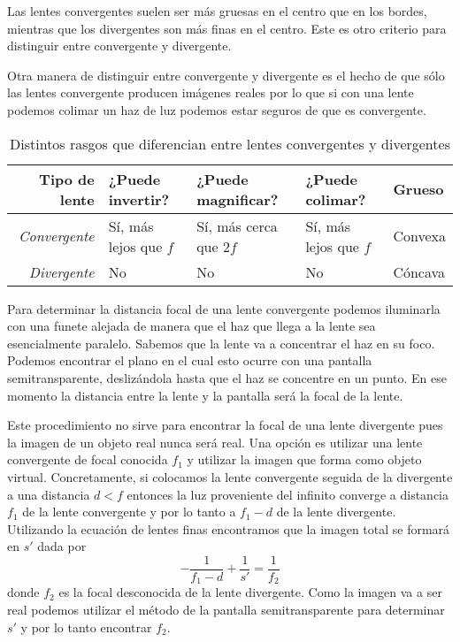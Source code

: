 \documentclass[12pt]{article}
\numberwithin{table}{section}
\numberwithin{figure}{section}
\numberwithin{equation}{section}
\begin{document}
Las lentes convergentes suelen ser más gruesas en el centro que en los bordes, mientras que los divergentes son más finas en el centro. Este es otro criterio para distinguir entre convergente y divergente. 

Otra manera de distinguir entre convergente y divergente es el hecho de que sólo las lentes convergente producen imágenes reales por lo que si con una lente podemos colimar un haz de luz podemos estar seguros de que es convergente. 

\begin{table}[htb]
	\small \sffamily \centering
	\caption{Distintos rasgos que diferencian entre lentes convergentes y divergentes}
	\label{tab:rasgos}
	\begin{tabular}{@{}rllll@{}}
		\toprule 
		\textbf{Tipo de lente} & ¿Puede invertir? & ¿Puede magnificar? & ¿Puede colimar? & Grueso \\
		\midrule
		\emph{Convergente} & Sí, más lejos que \( f \) & Sí, más cerca que \( 2f \) & Sí, más lejos que \( f \) & Convexa \\ 
		\emph{Divergente} & No & No & No & Cóncava  \\ 
\bottomrule
	\end{tabular}
\end{table}

Para determinar la distancia focal de una lente convergente podemos iluminarla con una funete alejada de manera que el haz que llega a la lente sea esencialmente paralelo. Sabemos que la lente va a concentrar el haz en su foco. Podemos encontrar el plano en el cual esto ocurre con una pantalla semitransparente, deslizándola hasta que el haz se concentre en un punto. En ese momento la distancia entre la lente y la pantalla será la focal de la lente.

Este procedimiento no sirve para encontrar la focal de una lente divergente pues la imagen de un objeto real nunca será real. Una opción es utilizar una lente convergente de focal conocida \( f_1 \) y utilizar la imagen que forma como objeto virtual. Concretamente, si colocamos la lente convergente seguida de la divergente a una distancia \( d < f \) entonces la luz proveniente del infinito converge a distancia \( f_1 \) de la lente convergente y por lo tanto a \( f_1 - d \) de la lente divergente. Utilizando la ecuación de lentes finas encontramos que la imagen total se formará en \( s' \) dada por
\begin{equation*}
	-\frac{1}{f_1 - d} + \frac{1}{s'} = \frac{1}{f_2}
\end{equation*}
donde \( f_2 \) es la focal desconocida de la lente divergente. Como la imagen va a ser real podemos utilizar el método de la pantalla semitransparente para determinar \( s' \) y por lo tanto encontrar \( f_2 \).
\end{document}
